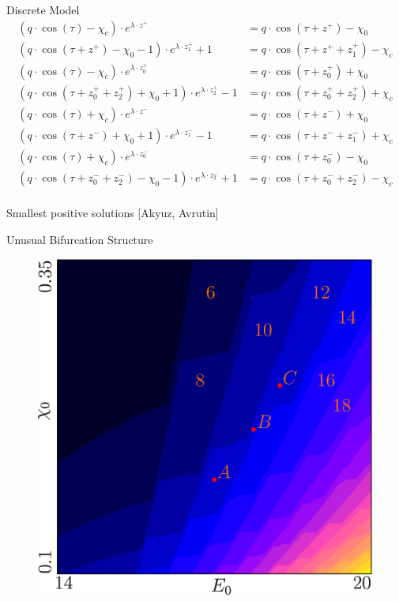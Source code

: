 \begin{frame}{Discrete Model}
    \vspace{-3em}
    \begin{align*}
        (q \cdot \cos(\tau) - \chi_{c}) \cdot e^{\lambda \cdot z^{+}}
            & = q \cdot \cos(\tau + z^{+}) - \chi_{0}                  \\
        (q \cdot \cos(\tau + z^{+}) - \chi_{0} - 1) \cdot e^{\lambda \cdot z_{1}^{+}} + 1
            & = q \cdot  \cos(\tau + z^{+} + z_{1}^{+}) - \chi_{c}     \\
        (q \cdot \cos(\tau) - \chi_{c}) \cdot e^{\lambda \cdot z_{0}^{+}}
            & = q \cdot \cos(\tau + z_{0}^{+}) + \chi_{0}              \\
        (q \cdot \cos(\tau + z_{0}^{+} + z_{2}^{+}) + \chi_{0} + 1) \cdot e^{\lambda \cdot z_{2}^{+}} - 1
            & = q \cdot  \cos(\tau + z_{0}^{+} + z_{2}^{+}) + \chi_{c} \\[1em]
        (q \cdot \cos(\tau) + \chi_{c}) \cdot e^{\lambda \cdot z^{-}}
            & = q \cdot \cos(\tau + z^{-}) + \chi_{0}                  \\
        (q \cdot \cos(\tau + z^{-}) + \chi_{0} + 1) \cdot e^{\lambda \cdot z_{1}^{-}} - 1
            & = q \cdot  \cos(\tau + z^{-} + z_{1}^{-}) + \chi_{c}     \\
        (q \cdot \cos(\tau) + \chi_{c}) \cdot e^{\lambda \cdot z_{0}^{-}}
            & = q \cdot \cos(\tau + z_{0}^{-}) - \chi_{0}              \\
        (q \cdot \cos(\tau + z_{0}^{-} + z_{2}^{-}) - \chi_{0} - 1) \cdot e^{\lambda \cdot z_{2}^{-}} + 1
            & = q \cdot  \cos(\tau + z_{0}^{-} + z_{2}^{-}) - \chi_{c} \\
    \end{align*}
    \vspace{-3em}
    \begin{flushright}
        Smallest positive solutions
        \hfill
        [Akyuz, Avrutin]
    \end{flushright}
\end{frame}

\begin{frame}{Unusual Bifurcation Structure}
    \begin{figure}
        \includegraphics[width=0.45 \textwidth]{Figs/og_model_period.png}
    \end{figure}
\end{frame}

